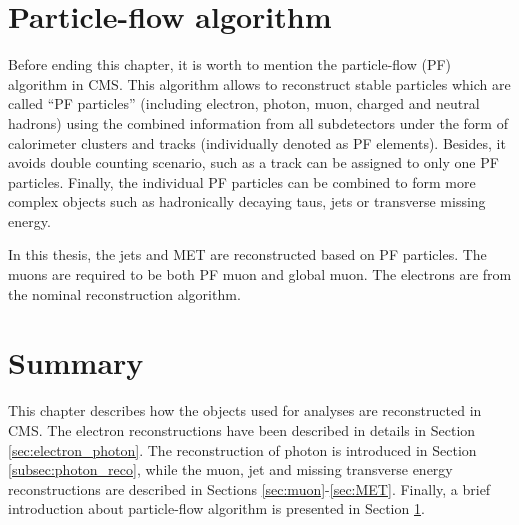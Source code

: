 \section{Particle-flow algorithm}\label{sec:PF_algorithm}
Before ending this chapter, it is worth to mention the particle-flow (PF) algorithm \cite{PF_1,PF_2} in CMS. This algorithm allows to reconstruct stable particles which are called ``PF particles'' (including electron, photon, muon, charged and neutral hadrons) using the combined information from all subdetectors under the form of calorimeter clusters and tracks (individually denoted as PF elements). Besides, it avoids double counting scenario, such as a track can be assigned to only one PF particles. Finally, the individual PF particles can be combined to form more complex objects such as hadronically decaying taus, jets or transverse missing energy.

In this thesis, the jets and MET are reconstructed based on PF particles. The muons are required to be both PF muon and global muon. The electrons are from the nominal reconstruction algorithm.
\section{Summary}

This chapter describes how the objects used for analyses are reconstructed in CMS.
The electron reconstructions have been described in details in Section \ref{sec:electron_photon}. The reconstruction of photon is introduced in Section \ref{subsec:photon_reco}, while the muon, jet and missing transverse energy reconstructions are described in Sections \ref{sec:muon}-\ref{sec:MET}. Finally, a brief introduction about particle-flow algorithm is presented in Section \ref{sec:PF_algorithm}.

